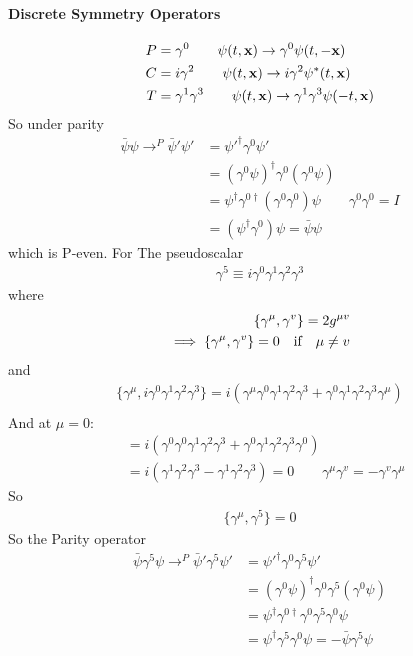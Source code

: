 \documentclass[../main.tex]{subfiles}
\begin{document}
\paragraph*{Discrete Symmetry Operators}
\begin{align*}
    P &= \gamma^0 \qquad \psi(t, \vb x) \to \gamma^0 \psi(t, - \vb x) \\
    C &= i \gamma^2 \qquad \psi(t, \vb x) \to i \gamma^2 \psi^*(t, \vb x) \\
    T &= \gamma^1 \gamma^3 \qquad \psi(t, \vb x) \to \gamma^1 \gamma^3 \psi(-t, \vb x)
\end{align*}
So under parity
\begin{align*}
    \bar \psi \psi \to^P \bar\psi' \psi' &= \psi'^\dagger \gamma^0 \psi' \\
    &= (\gamma^0 \psi)^\dagger \gamma^0 (\gamma^0 \psi) \\
    &= \psi^\dagger \gamma^{0\dagger} (\gamma^0 \gamma^0) \psi \qquad \gamma^0 \gamma^0 = I \\
    &= (\psi^\dagger \gamma^0) \psi = \bar \psi \psi
\end{align*}
which is P-even. For The pseudoscalar
\begin{align*}
    \gamma^5 \equiv i \gamma^0 \gamma^1 \gamma^2 \gamma^3
\end{align*}
where
\begin{align*}
    \{\gamma^\mu, \gamma^v\} = 2g^{\mu v} \\
    \implies \{\gamma^\mu, \gamma^v\} = 0 \qqtext{if} \mu \neq v
\end{align*}
and
\begin{align*}
    \{\gamma^\mu, i \gamma^0 \gamma^1 \gamma^2 \gamma^3\} = i(\gamma^\mu \gamma^0 \gamma^1 \gamma^2 \gamma^3 + \gamma^0 \gamma^1 \gamma^2 \gamma^3 \gamma^\mu) \\
\end{align*}
And at $\mu = 0$:
\begin{align*}
    &= i (\gamma^0 \gamma^0 \gamma^1 \gamma^2 \gamma^3 + \gamma^0 \gamma^1 \gamma^2 \gamma^3 \gamma^0) \\
    &= i (\gamma^1 \gamma^2 \gamma^3 - \gamma^1 \gamma^2 \gamma^3) = 0 \qquad \gamma^\mu \gamma^v = - \gamma^v \gamma^\mu
\end{align*}
So
\begin{align*}
    \{\gamma^\mu, \gamma^5\} = 0
\end{align*}
So the Parity operator
\begin{align*}
    \bar\psi \gamma^5 \psi \to^P \bar\psi' \gamma^5 \psi' &= \psi'^\dagger \gamma^0 \gamma^5 \psi' \\
    &= (\gamma^0 \psi)^\dagger \gamma^0 \gamma^5 (\gamma^0 \psi) \\
    &= \psi^\dagger \gamma^{0\dagger} \gamma^0 \gamma^5 \gamma^0 \psi \\
    &= \psi^\dagger \gamma^5 \gamma^0 \psi = - \bar \psi \gamma^5 \psi
\end{align*}
\end{document}
